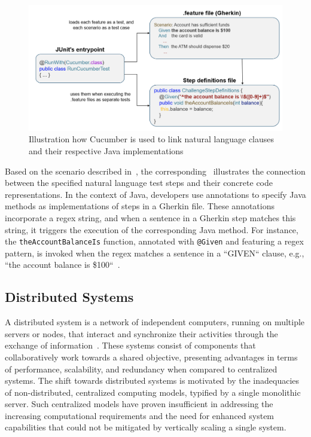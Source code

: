 \begin{figure}
    \centering
    \includegraphics[width=\linewidth]{files/figures/cucumber_test_step_mapping.png}
    \caption{Illustration how Cucumber is used to link natural language clauses and their respective Java implementations}
    \label{fig:cucumber-mapping}
\end{figure}

Based on the scenario described in~, the corresponding~ illustrates the connection between the specified natural language test steps and their concrete code representations. In the context of Java, developers use annotations to specify Java methods as implementations of steps in a Gherkin file. These annotations incorporate a regex string, and when a sentence in a Gherkin step matches this string, it triggers the execution of the corresponding Java method. For instance, the \texttt{theAccountBalanceIs} function, annotated with \texttt{@Given} and featuring a regex pattern, is invoked when the regex matches a sentence in a ``GIVEN`` clause, e.g., ``the account balance is \$100``~\cite{noauthor_bdd_nodate}.

\subsection{Distributed Systems}
\label{subsec:dissys}
A distributed system is a network of independent computers, running on multiple servers or nodes, that interact and synchronize their activities through the exchange of information~\cite{tanenbaum2007distributed}. These systems consist of components that collaboratively work towards a shared objective, presenting advantages in terms of performance, scalability, and redundancy when compared to centralized systems. The shift towards distributed systems is motivated by the inadequacies of non-distributed, centralized computing models, typified by a single monolithic server. Such centralized models have proven insufficient in addressing the increasing computational requirements and the need for enhanced system capabilities that could not be mitigated by vertically scaling a single system.

